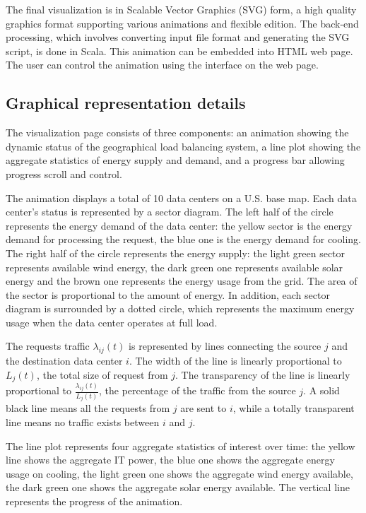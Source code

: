 \documentclass{acm_proc_article-sp}
\begin{document}
The final visualization is in Scalable Vector Graphics (SVG) form, a high quality graphics format supporting various animations and flexible edition. The back-end processing, which involves converting input file format and generating the SVG script, is done in Scala. This animation can be embedded into HTML web page. The user can control the animation using the interface on the web page.
   
\subsection{Graphical representation details}
The visualization page consists of three components: an animation showing the dynamic status of the geographical load balancing system, a line plot showing the aggregate statistics of energy supply and demand, and a progress bar allowing progress scroll and control.

The animation displays a total of 10 data centers on a U.S. base map. Each data center's status is represented by a sector diagram. The left half of the circle represents the energy demand of the data center: the yellow sector is the energy demand for processing the request, the blue one is the energy demand for cooling. The right half of the circle represents the energy supply: the light green sector represents available wind energy, the dark green one represents available solar energy and the brown one represents the energy usage from the grid. The area of the sector is proportional to the amount of energy. In addition, each sector diagram is surrounded by a dotted circle, which represents the maximum energy usage when the data center operates at full load.

The requests traffic $\lambda_{ij}(t)$ is represented by lines connecting the source $j$ and the destination data center $i$. The width of the line is linearly proportional to $L_j(t)$, the total size of request from $j$. The transparency of the line is linearly proportional to $\frac{\lambda_{ij}(t)}{L_j(t)}$, the percentage of the traffic from the source $j$. A solid black line means all the requests from $j$ are sent to $i$, while a totally transparent line means no traffic exists between $i$ and $j$.

The line plot represents four aggregate statistics of interest over time: the yellow line shows the aggregate IT power, the blue one shows the aggregate energy usage on cooling, the light green one shows the aggregate wind energy available, the dark green one shows the aggregate solar energy available. The vertical line represents the progress of the animation.
\end{document}
